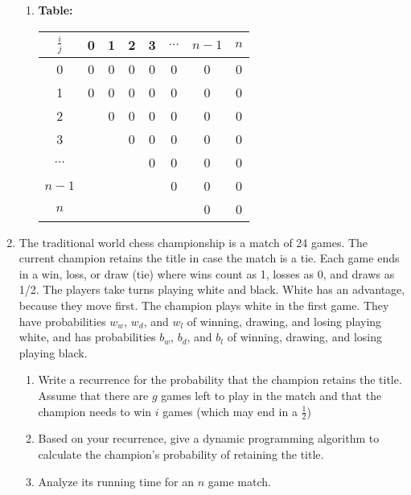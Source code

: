 \documentclass[12pt]{article}
\begin{document}
\begin{enumerate}
\begin{enumerate}
        \item {\bf Table:}
        \begin{center}
            \begin{tabular}{|c|c|c|c|c|c|c|c|} \hline
                $\frac{i}{j}$  & 0 & 1 & 2 & 3 & $\ldots{}$ & $n-1$ & $n$\\ \hline
                0 & 0 & 0 & 0 & 0 & 0 & 0 & 0 \\ \hline
                1 & 0 & 0 & 0 & 0 & 0 & 0 & 0 \\ \hline
                2 & & 0 & 0 & 0 & 0 & 0 & 0 \\ \hline
                3 & & & 0 & 0 & 0 & 0 & 0 \\ \hline
                $\ldots{}$ & & & & 0 & 0 & 0 & 0 \\ \hline
                $n-1$ & & & & & 0 & 0 & 0 \\ \hline
                $n$ & & & & & & 0 & 0 \\ \hline
                \hline

                \end{tabular}
        \end{center}
    \end{enumerate}

    \pagebreak
    \item The traditional world chess championship is a match of 24 games. The
    current champion retains the title in case the match is a tie. Each game
    ends in a win, loss, or draw (tie) where wins count as 1, losses as 0, and
    draws as 1/2. The players take turns playing white and black. White has an
    advantage, because they move first. The champion plays white in the first game.
    They have probabilities $w_w$, $w_d$, and $w_l$ of winning, drawing, and losing
    playing white, and has probabilities $b_w$, $b_d$, and $b_l$ of winning,
    drawing, and losing playing black.
    \begin{enumerate}
        \item Write a recurrence for the probability that the champion retains
        the title. Assume that there are $g$ games left to play in the match
        and that the champion needs to win $i$ games (which may end in a 
        $\frac{1}{2}$)

        \item Based on your recurrence, give a dynamic programming algorithm to
        calculate the champion’s probability of retaining the title.

        \item Analyze its running time for an $n$ game match.
    \end{enumerate}
\end{enumerate}
\end{document}

